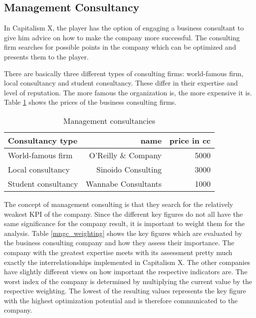 \subsection{Management Consultancy} \label{management_consultancy_simulation}
In Capitalism X, the player has the option of engaging a business consultant to give him advice on how to make the company more successful. 
The consulting firm searches for possible points in the company which can be optimized and presents them to the player.

There are basically three different types of consulting firms: world-famous firm, local consultancy and student consultancy. These differ in their expertise and level of reputation. The more famous the organization is, the more expensive it is. Table \ref{mng_consultancy} shows the prices of the business consulting firms. 

\begin{table}[ht]
\centering
\begin{tabular}{|l|r|r|}
\hline
\textbf{Consultancy type}   & \textbf{name}  & \textbf{price in cc} \\ \hline
World-famous firm       & O'Reilly \& Company     & 5000     \\
Local consultancy       & Sinoido Consulting     & 3000     \\
Student consultancy     & Wannabe Consultants    & 1000     \\
\hline
\end{tabular}
\caption{Management consultancies}
\label{mng_consultancy}
\end{table}

The concept of management consulting is that they search for the relatively weakest KPI of the company. Since the different key figures do not all have the same significance for the company result, it is important to weight them for the analysis.
Table \ref{mngc_weighting} shows the key figures which are evaluated by the business consulting company and how they assess their importance.
The company with the greatest expertise meets with its assessment pretty much exactly the interrelationships implemented in Capitalism X. The other companies have slightly different views on how important the respective indicators are. 
The worst index of the company is determined by multiplying the current value by the respective weighting. The lowest of the resulting values represents the key figure with the highest optimization potential and is therefore communicated to the company. 
 
